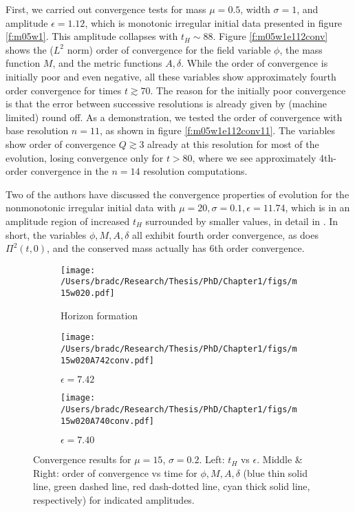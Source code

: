 \documentclass[../PhD.tex]{subfiles}
\begin{document}
\begin{subappendices}
First, we carried out convergence tests for mass $\mu=0.5$, width
$\sigma=1$, and amplitude $\epsilon=1.12$, which is monotonic irregular
initial data presented in figure \ref{f:m05w1}.  
This amplitude collapses with $t_H\sim 88$. Figure \ref{f:m05w1e112conv}
shows the ($L^2$ norm) order of convergence for the field variable 
$\phi$, the mass 
function $M$, and the metric functions $A,\delta$.  While the order of
convergence is initially poor and even negative, all these variables show
approximately fourth order convergence for times $t\gtrsim 70$.  The 
reason for the initially poor convergence is that the error between 
successive resolutions is already given by (machine limited) round off.
As a demonstration, we tested the order of convergence
with base resolution $n=11$, as shown in figure \ref{f:m05w1e112conv11}.
The variables show order of convergence $Q\gtrsim 3$ already at this resolution
for most of the evolution, losing convergence only for $t>80$, where we
see approximately 4th-order convergence in the $n=14$ resolution
computations.

Two of the authors have discussed the convergence properties of evolution for
the nonmonotonic irregular initial data with 
$\mu=20,\sigma=0.1,\epsilon=11.74$, which is in an amplitude region of 
increased $t_H$ surrounded by smaller values, in detail in \cite{1508.02709}.
In short, the variables $\phi,M,A,\delta$ all exhibit fourth order 
convergence, as does $\Pi^2(t,0)$, and the conserved mass actually has 6th 
order convergence.  

\begin{figure}[!t]
\centering
\begin{subfigure}[t]{0.31\textwidth}
\texttt{[image: /Users/bradc/Research/Thesis/PhD/Chapter1/figs/m15w020.pdf]}
\caption{Horizon formation}
\label{f:m15w020}
\end{subfigure}
\begin{subfigure}[t]{0.31\textwidth}
\texttt{[image: /Users/bradc/Research/Thesis/PhD/Chapter1/figs/m15w020A742conv.pdf]}
\caption{$\epsilon=7.42$}
\label{f:m15w020A742conv}
\end{subfigure}
\begin{subfigure}[t]{0.31\textwidth}
\texttt{[image: /Users/bradc/Research/Thesis/PhD/Chapter1/figs/m15w020A740conv.pdf]}
\caption{$\epsilon=7.40$}
\label{f:m15w020A740conv}
\end{subfigure}
\caption[Order of convergence for $\phi$, $M$, $A$, $\delta$ as a function of time for $\mu = 15$ at nearby amplitudes]{Convergence results for $\mu=15$, $\sigma=0.2$.
Left: $t_H$ vs $\epsilon$.  Middle \& Right: order of convergence vs time 
for $\phi,M,A,\delta$  (blue thin solid line, green dashed line, red 
dash-dotted line, cyan thick solid line, respectively)
for indicated amplitudes.
}
\label{f:m15w020convergence}
\end{figure}


\end{subappendices}
\end{document}
